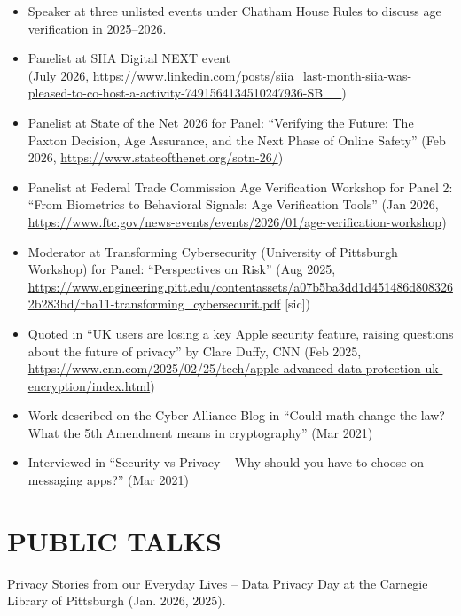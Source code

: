 \documentclass{res}
\begin{document}
\begin{resume}
\begin{itemize}
    \item Speaker at three unlisted events under Chatham House Rules to discuss age verification in 2025--2026.
    \item Panelist at SIIA Digital NEXT event \\
        (July 2026, \url{https://www.linkedin.com/posts/siia_last-month-siia-was-pleased-to-co-host-a-activity-7491564134510247936-SB__}) \\
    \item Panelist at State of the Net 2026 for Panel: ``Verifying the Future: The Paxton Decision, Age Assurance, and the Next Phase of Online Safety''
        (Feb 2026, \url{https://www.stateofthenet.org/sotn-26/}) \\
    \item Panelist at Federal Trade Commission Age Verification Workshop for Panel 2: ``From Biometrics to Behavioral Signals: Age Verification Tools''
        (Jan 2026, \url{https://www.ftc.gov/news-events/events/2026/01/age-verification-workshop}) \\
    \item Moderator at Transforming Cybersecurity (University of Pittsburgh Workshop) for Panel: ``Perspectives on Risk'' 
        (Aug 2025, \url{https://www.engineering.pitt.edu/contentassets/a07b5ba3dd1d451486d8083262b283bd/rba11-transforming\_cybersecurit.pdf} [sic]) \\
    \item Quoted in ``UK users are losing a key Apple security feature, raising questions about the future of privacy'' by Clare Duffy, CNN (Feb 2025,
        \url{https://www.cnn.com/2025/02/25/tech/apple-advanced-data-protection-uk-encryption/index.html}) \\
    \item Work described on the Cyber Alliance Blog in ``Could math change the law? What the 5th Amendment means in cryptography'' (Mar 2021) \\
    \item Interviewed in ``Security vs Privacy -- Why should you have to choose on messaging apps?'' (Mar 2021)
\end{itemize}

\section{PUBLIC TALKS}  
\vspace{0.1in}
Privacy Stories from our Everyday Lives -- Data Privacy Day at the Carnegie Library of Pittsburgh (Jan. 2026, 2025). \\


\end{resume}
\end{document}
